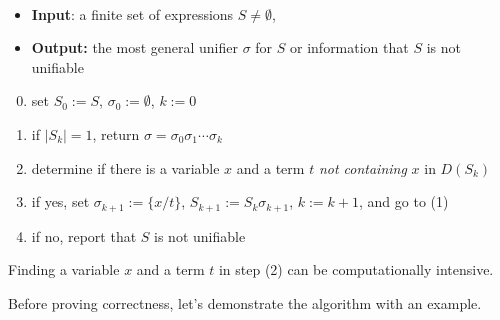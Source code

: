 \begin{algorithm}{\,}
\begin{itemize}
    \item \textbf{Input}: a finite set of expressions $S\neq\emptyset$,
    \item \textbf{Output:} the most general unifier $\sigma$ for $S$ or information that $S$ is not unifiable
\end{itemize}
\begin{enumerate}[(1)]\setcounter{enumi}{-1}
    \item set $S_0:=S$, $\sigma_0:=\emptyset$, $k:=0$
    \item if $|S_k|=1$, return $\sigma=\sigma_0\sigma_1\cdots \sigma_k$
    \item determine if there is a variable $x$ and a term $t$ \emph{not containing} $x$ in $D(S_k)$
    \item if yes, set $\sigma_{k+1}:=\{x/t\}$, $S_{k+1}:=S_k\sigma_{k+1}$, $k:=k+1$, and go to (1)
    \item if no, report that $S$ is not unifiable
\end{enumerate}
\end{algorithm}

\begin{remark}
    Finding a variable $x$ and a term $t$ in step (2) can be computationally intensive.
\end{remark}

Before proving correctness, let's demonstrate the algorithm with an example.

